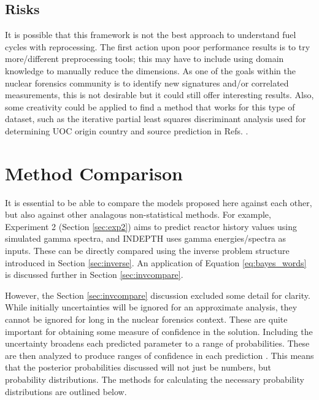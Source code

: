 \subsection*{Risks}

It is possible that this framework is not the best approach to understand fuel
cycles with reprocessing. The first action upon poor performance results is to
try more/different preprocessing tools; this may have to include using domain
knowledge to manually reduce the dimensions. As one of the goals within the
nuclear forensics community is to identify new signatures and/or correlated
measurements, this is not desirable but it could still offer interesting
results. Also, some creativity could be applied to find a method that works for
this type of dataset, such as the iterative partial least squares discriminant
analysis used for determining \gls{UOC} origin country and source prediction in
Refs.  \cite{robel_2009, pu_discrimination}.

\section{Method Comparison}
\label{sec:modelcompare}

It is essential to be able to compare the models proposed here against each
other, but also against other analagous non-statistical methods.  For example,
Experiment 2 (Section \ref{sec:exp2}) aims to predict reactor history values
using simulated gamma spectra, and \gls{INDEPTH} uses gamma energies/spectra as
inputs.  These can be directly compared using the inverse problem structure
introduced in Section \ref{sec:inverse}. An application of Equation
\ref{eq:bayes_words} is discussed further in Section \ref{sec:invcompare}.

However, the Section \ref{sec:invcompare} discussion excluded some detail for
clarity. While initially uncertainties will be ignored for an approximate
analysis, they cannot be ignored for long in the nuclear forensics context.
These are quite important for obtaining some measure of confidence in the
solution.  Including the uncertainty broadens each predicted parameter to a
range of probabilities.  These are then analyzed to produce ranges of
confidence in each prediction \cite{bayes_compare}.  This means that the
posterior probabilities discussed will not just be numbers, but probability
distributions.  The methods for calculating the necessary probability
distributions are outlined below.

